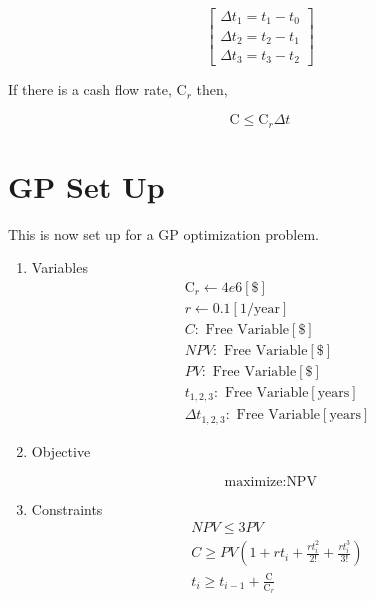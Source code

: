 \documentclass[10pt, a4paper]{article}
\begin{document}
\[ \begin{bmatrix} \Delta t_1 = t_1 - t_0 \\
\Delta t_2 = t_2 - t_1 \\
\Delta t_3 = t_3 - t_2 
\end{bmatrix} \]

If there is a cash flow rate, C$_r$ then, 

\[ \text{C} \leq \text{C}_r \Delta t \] 

\section*{GP Set Up}

This is now set up for a GP optimization problem. 

\begin{enumerate}

\item Variables
\[ \begin{array}{ll}
 & \text{C}_r \gets 4e6 [\$] \\
 & r \gets 0.1 [1/\text{year}] \\
 & C : \text{ Free Variable} [\$] \\
 & NPV : \text{ Free Variable} [\$] \\
 & PV: \text{ Free Variable} [\$] \\
 & t_{1,2,3}: \text{ Free Variable} [\text{years}] \\
 & \Delta t_{1,2,3}: \text{ Free Variable} [\text{years}] 
 \end{array} \]
 
 \item Objective 
 
 \[ \text{maximize}: \text{NPV} \]
 
 \item Constraints
 \[ \begin{array}{ll}
 & NPV \leq 3PV \\
 & C \geq PV\left(1 + rt_i + \frac{rt_i^2}{2!} + \frac{rt_i^3}{3!} \right) \\
 & t_i \geq t_{i-1} + \frac{\text{C}}{\text{C}_r}  
 \end{array} \]



\end{enumerate}
\end{document}
